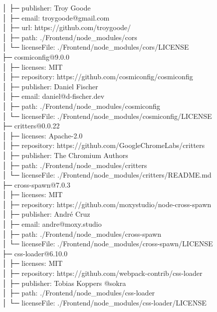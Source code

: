 \documentclass[
    paper=a4,
    twoside=false,
    parskip=half,
    listof=entryprefix,
    listof=totoc,
    index=totoc,
    bibliography=totoc,
    headsepline,
]{scrbook}
\begin{document}
    │  ├─ publisher: Troy Goode\\
    │  ├─ email: troygoode@gmail.com\\
    │  ├─ url: https://github.com/troygoode/\\
    │  ├─ path: ./Frontend/node\_modules/cors\\
    │  └─ licenseFile: ./Frontend/node\_modules/cors/LICENSE\\
    ├─ cosmiconfig@9.0.0\\
    │  ├─ licenses: MIT\\
    │  ├─ repository: https://github.com/cosmiconfig/cosmiconfig\\
    │  ├─ publisher: Daniel Fischer\\
    │  ├─ email: daniel@d-fischer.dev\\
    │  ├─ path: ./Frontend/node\_modules/cosmiconfig\\
    │  └─ licenseFile: ./Frontend/node\_modules/cosmiconfig/LICENSE\\
    ├─ critters@0.0.22\\
    │  ├─ licenses: Apache-2.0\\
    │  ├─ repository: https://github.com/GoogleChromeLabs/critters\\
    │  ├─ publisher: The Chromium Authors\\
    │  ├─ path: ./Frontend/node\_modules/critters\\
    │  └─ licenseFile: ./Frontend/node\_modules/critters/README.md\\
    ├─ cross-spawn@7.0.3\\
    │  ├─ licenses: MIT\\
    │  ├─ repository: https://github.com/moxystudio/node-cross-spawn\\
    │  ├─ publisher: André Cruz\\
    │  ├─ email: andre@moxy.studio\\
    │  ├─ path: ./Frontend/node\_modules/cross-spawn\\
    │  └─ licenseFile: ./Frontend/node\_modules/cross-spawn/LICENSE\\
    ├─ css-loader@6.10.0\\
    │  ├─ licenses: MIT\\
    │  ├─ repository: https://github.com/webpack-contrib/css-loader\\
    │  ├─ publisher: Tobias Koppers @sokra\\
    │  ├─ path: ./Frontend/node\_modules/css-loader\\
    │  └─ licenseFile: ./Frontend/node\_modules/css-loader/LICENSE\\
\end{document}
